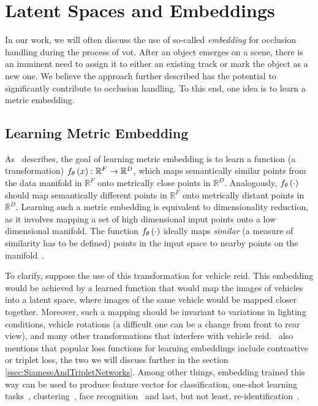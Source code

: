 \section{Latent Spaces and Embeddings}
\label{sec:LatentSpacesAndEmbeddings}

In our work, we will often discuss the use of so-called \emph{embedding} for occlusion handling during the process of \gls{vot}. After an object emerges on a scene, there is an imminent need to assign it to either an existing track or mark the object as a new one. We believe the approach further described has the potential to significantly contribute to occlusion handling. To this end, one idea is to learn a metric embedding. 

\subsection{Learning Metric Embedding}
\label{ssec:LearningMetricEmbedding}

As~\cite{Hermans2017} describes, the goal of learning metric embedding is to learn a function (a transformation) ${f_\theta} \left( x \right): \mathbb{R}^F \to \mathbb{R}^D$, which maps semantically similar points from the data manifold in $\mathbb{R}^F$ onto metrically close points in $\mathbb{R}^D$. Analogously, ${f_\theta} \left( \cdot \right)$ should map semantically different points in $\mathbb{R}^F$ onto metrically distant points in $\mathbb{R}^D$. Learning such a metric embedding is equivalent to dimensionality reduction, as it involves mapping a set of high dimensional input points onto a low dimensional manifold. The function ${f_\theta} \left( \cdot \right)$ ideally maps \emph{similar} (a measure of similarity has to be defined) points in the input space to nearby points on the manifold~\cite{Hadsell2006}.

To clarify, suppose the use of this transformation for vehicle \gls{reid}. This embedding would be achieved by a learned function that would map the images of vehicles into a latent space, where images of the same vehicle would be mapped closer together. Moreover, such a mapping should be invariant to variations in lighting conditions, vehicle rotations (a difficult one can be a change from front to rear view), and many other transformations that interfere with vehicle \gls{reid}.~\cite{Kuma2019} also mentions that popular loss functions for learning embeddings include contrastive or triplet loss, the two we will discuss further in the section \ref{ssec:SiameseAndTripletNetworks}. Among other things, embedding trained this way can be used to produce feature vector for classification, one-shot learning tasks~\cite{Koch2011}, clustering~\cite{Schroff2015}, face recognition~\cite{Parkhi2015} and last, but not least, re-identification~\cite{Kuma2019}.

